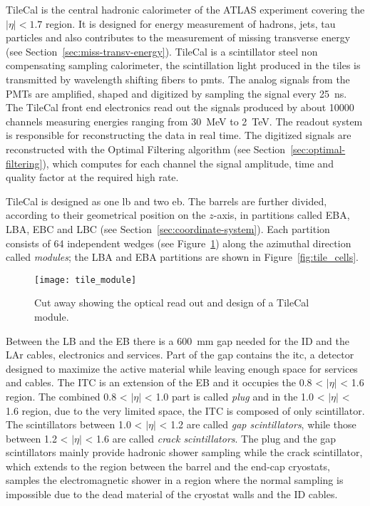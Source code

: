 TileCal is the central hadronic calorimeter of the ATLAS experiment covering the
$|\eta| < 1.7$ region. It is designed for energy measurement of hadrons, jets,
tau particles and also contributes to the measurement of missing transverse
energy (see Section~\ref{sec:miss-transv-energy}). TileCal is a scintillator
steel non compensating sampling calorimeter, the scintillation light produced in
the tiles is transmitted by wavelength shifting fibers to \glspl{pmt}. The
analog signals from the PMTs are amplified, shaped and digitized by sampling the
signal every 25~ns. The TileCal front end electronics read out the signals
produced by about 10000 channels measuring energies ranging from 30~MeV to
2~TeV. The readout system is responsible for reconstructing the data in real
time. The digitized signals are reconstructed with the Optimal Filtering
algorithm (see Section~\ref{sec:optimal-filtering}), which computes for each
channel the signal amplitude, time and quality factor at the required high rate.

TileCal is designed as one \gls{lb} and two \gls{eb}. The barrels are further
divided, according to their geometrical position on the $z$-axis, in partitions
called EBA, LBA, EBC and LBC (see Section~\ref{sec:coordinate-system}). Each
partition consists of 64 independent wedges (see Figure~\ref{fig:tile_mod})
along the azimuthal direction called \emph{modules}; the LBA and EBA partitions
are shown in Figure~\ref{fig:tile_cells}.

\begin{figure}[!h]
  \centering
    \texttt{[image: tile\_module]}
    \caption{Cut away showing the optical read out and design of a TileCal
      module.}
    \label{fig:tile_mod}
\end{figure}

Between the LB and the EB there is a 600~mm gap needed for the ID and the LAr
cables, electronics and services. Part of the gap contains the \gls{itc}, a
detector designed to maximize the active material while leaving enough space for
services and cables. The ITC is an extension of the EB and it occupies the 0.8 <
$|\eta|$ < 1.6 region. The combined 0.8 < $|\eta|$ < 1.0 part is called
\emph{plug} and in the 1.0 < $|\eta|$ < 1.6 region, due to the very limited
space, the ITC is composed of only scintillator. The scintillators between 1.0 <
$|\eta|$ < 1.2 are called \emph{gap scintillators}, while those between 1.2 <
$|\eta|$ < 1.6 are called \emph{crack scintillators}. The plug and the gap
scintillators mainly provide hadronic shower sampling while the crack
scintillator, which extends to the region between the barrel and the end-cap
cryostats, samples the electromagnetic shower in a region where the normal
sampling is impossible due to the dead material of the cryostat walls and the ID
cables.

